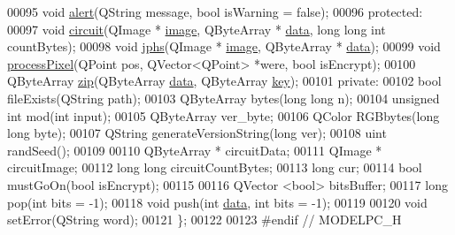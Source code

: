 \begin{DoxyCode}
00095     \textcolor{keywordtype}{void} \mbox{\hyperlink{class_model_p_c_a9079a101d83672aa48fd2dbac797de40}{alert}}(QString message, \textcolor{keywordtype}{bool} isWarning = \textcolor{keyword}{false});
00096 \textcolor{keyword}{protected}:
00097     \textcolor{keywordtype}{void} \mbox{\hyperlink{class_model_p_c_a1d0091062a0c836b283ec2f67411623b}{circuit}}(QImage * \mbox{\hyperlink{namespacetests-setup_ad55b685280f549e15688a94cbb89f512}{image}}, QByteArray * \mbox{\hyperlink{namespace_errors_dict_setup_af570460846fb9f0c91abd308a095dcdc}{data}}, \textcolor{keywordtype}{long} \textcolor{keywordtype}{long} \textcolor{keywordtype}{int} countBytes);
00098     \textcolor{keywordtype}{void} \mbox{\hyperlink{class_model_p_c_a8bee0255c09449868c7e6097afaaf0cd}{jphs}}(QImage * \mbox{\hyperlink{namespacetests-setup_ad55b685280f549e15688a94cbb89f512}{image}}, QByteArray * \mbox{\hyperlink{namespace_errors_dict_setup_af570460846fb9f0c91abd308a095dcdc}{data}});
00099     \textcolor{keywordtype}{void} \mbox{\hyperlink{class_model_p_c_a1171f9fe1550133dc9053a46b4e5bcfd}{processPixel}}(QPoint pos, QVector<QPoint> *were, \textcolor{keywordtype}{bool} isEncrypt);
00100     QByteArray \mbox{\hyperlink{class_model_p_c_afebbbfa4b07deba4f68fc6dfb50f353f}{zip}}(QByteArray \mbox{\hyperlink{namespace_errors_dict_setup_af570460846fb9f0c91abd308a095dcdc}{data}}, QByteArray \mbox{\hyperlink{namespace_errors_dict_setup_a09c268098d09ffb8e5504f30fa6d5dd9}{key}});
00101 \textcolor{keyword}{private}:
00102     \textcolor{keywordtype}{bool} fileExists(QString path);
00103     QByteArray bytes(\textcolor{keywordtype}{long} \textcolor{keywordtype}{long} n);
00104     \textcolor{keywordtype}{unsigned} \textcolor{keywordtype}{int} mod(\textcolor{keywordtype}{int} input);
00105     QByteArray ver\_byte;
00106     QColor RGBbytes(\textcolor{keywordtype}{long} \textcolor{keywordtype}{long} byte);
00107     QString generateVersionString(\textcolor{keywordtype}{long} ver);
00108     uint randSeed();
00109 
00110     QByteArray * circuitData;
00111     QImage * circuitImage;
00112     \textcolor{keywordtype}{long} \textcolor{keywordtype}{long} circuitCountBytes;
00113     \textcolor{keywordtype}{long} cur;
00114     \textcolor{keywordtype}{bool} mustGoOn(\textcolor{keywordtype}{bool} isEncrypt);
00115 
00116     QVector <bool> bitsBuffer;
00117     \textcolor{keywordtype}{long} pop(\textcolor{keywordtype}{int} bits = -1);
00118     \textcolor{keywordtype}{void} push(\textcolor{keywordtype}{int} \mbox{\hyperlink{namespace_errors_dict_setup_af570460846fb9f0c91abd308a095dcdc}{data}}, \textcolor{keywordtype}{int} bits = -1);
00119 
00120     \textcolor{keywordtype}{void} setError(QString word);
00121 \};
00122 
00123 \textcolor{preprocessor}{#endif // MODELPC\_H}
\end{DoxyCode}
